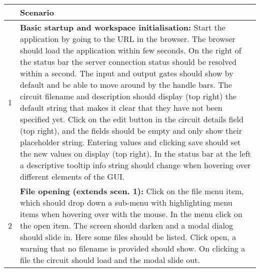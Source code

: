 \documentclass{article}
\begin{document}
\begin{center}
\begin{tabularx}{\textwidth}{r p{15cm}}
& \textbf{Scenario} \\\hline
1 & \textbf{Basic startup and workspace initialisation:} Start the application by going to the URL in the browser. The browser should load the application within few seconds. On the right of the status bar the server connection status should be resolved within a second. The input and output gates should show by default and be able to move around by the handle bars. The circuit filename and description should display (top right) the default string that makes it clear that they have not been specified yet. Click on the edit button in the circuit details field (top right), and the fields should be empty and only show their placeholder string. Entering values and clicking save should set the new values on display (top right). In the status bar at the left a descriptive tooltip info string should change when hovering over different elements of the GUI. \\

2 & \textbf{File opening (extends scen. 1):} Click on the file menu item, which should drop down a sub-menu with highlighting menu items when hovering over with the mouse. In the menu click on the open item. The screen should darken and a modal dialog should slide in. Here some files should be listed. Click open, a warning that no filename is provided should show. On clicking a file the circuit should load and the modal slide out.\\


\end{tabularx}
\end{center}
\end{document}
